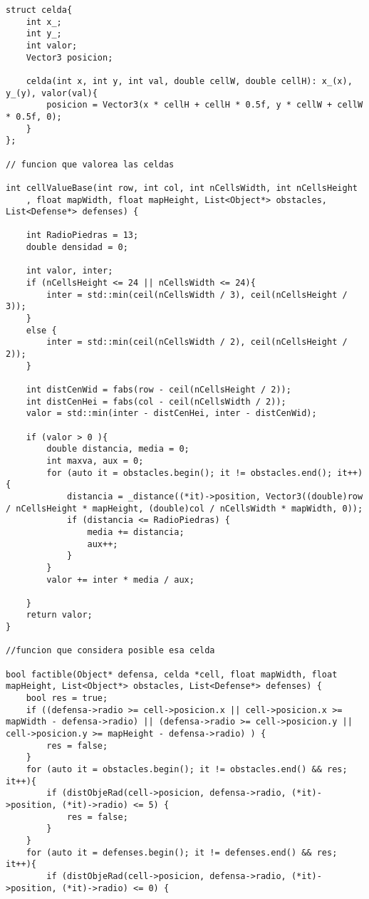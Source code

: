 \begin{lstlisting}
struct celda{
    int x_;
    int y_;
    int valor;
    Vector3 posicion;

    celda(int x, int y, int val, double cellW, double cellH): x_(x), y_(y), valor(val){
        posicion = Vector3(x * cellH + cellH * 0.5f, y * cellW + cellW * 0.5f, 0);
    }
};

// funcion que valorea las celdas

int cellValueBase(int row, int col, int nCellsWidth, int nCellsHeight
	, float mapWidth, float mapHeight, List<Object*> obstacles, List<Defense*> defenses) {
    
    int RadioPiedras = 13;
    double densidad = 0;

    int valor, inter;
    if (nCellsHeight <= 24 || nCellsWidth <= 24){
        inter = std::min(ceil(nCellsWidth / 3), ceil(nCellsHeight / 3));
    }
    else {
        inter = std::min(ceil(nCellsWidth / 2), ceil(nCellsHeight / 2));
    }

    int distCenWid = fabs(row - ceil(nCellsHeight / 2));
    int distCenHei = fabs(col - ceil(nCellsWidth / 2));
    valor = std::min(inter - distCenHei, inter - distCenWid);

    if (valor > 0 ){
        double distancia, media = 0;
        int maxva, aux = 0;
        for (auto it = obstacles.begin(); it != obstacles.end(); it++) {
            distancia = _distance((*it)->position, Vector3((double)row / nCellsHeight * mapHeight, (double)col / nCellsWidth * mapWidth, 0));
            if (distancia <= RadioPiedras) {
                media += distancia;
                aux++;
            }
        }
        valor += inter * media / aux;
    
    }
    return valor;
}

//funcion que considera posible esa celda

bool factible(Object* defensa, celda *cell, float mapWidth, float mapHeight, List<Object*> obstacles, List<Defense*> defenses) {
    bool res = true;
    if ((defensa->radio >= cell->posicion.x || cell->posicion.x >= mapWidth - defensa->radio) || (defensa->radio >= cell->posicion.y || cell->posicion.y >= mapHeight - defensa->radio) ) {
        res = false;
    }
    for (auto it = obstacles.begin(); it != obstacles.end() && res; it++){
        if (distObjeRad(cell->posicion, defensa->radio, (*it)->position, (*it)->radio) <= 5) {
            res = false;
        }
    }
    for (auto it = defenses.begin(); it != defenses.end() && res; it++){
        if (distObjeRad(cell->posicion, defensa->radio, (*it)->position, (*it)->radio) <= 0) {
            

\end{lstlisting}

